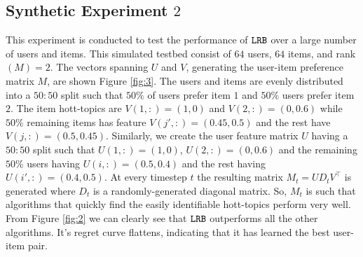 


\subsection{Synthetic Experiment $2$}
This experiment is conducted to test the performance of ${\tt LRB}$ over a large number of users and items. This simulated testbed consist of $64$ users, $64$ items, and rank$(M) = 2$. The vectors spanning $U$ and $V$, generating the user-item preference matrix $M$, are shown Figure \ref{fig:3}. The users and items are evenly distributed into a $50:50$ split such that $50\%$ of users prefer item $1$ and $50\%$ users prefer item $2$. The item hott-topics are $V(1,:) = (1,0)$ and $V(2,:) = (0, 0.6)$ while $50\%$ remaining  items has feature $V(j',:) = (0.45, 0.5)$ and the rest have $V(j,:) = (0.5, 0.45)$. Similarly, we create the user feature matrix $U$ having a $50:50$ split such that $U(1,:) = (1,0)$, $U(2,:) = (0,0.6)$ and the remaining $50\%$ users having $U(i,:) = (0.5,0.4)$ and the rest having $U(i',:) = (0.4,0.5)$. At every timestep $t$ the resulting matrix $M_t =UD_tV^{\intercal}$ is generated where $D_t$ is a randomly-generated diagonal matrix. So, $M_t$ is such that algorithms that quickly find the easily identifiable hott-topics perform very well. From Figure \ref{fig:2} we can clearly see that ${\tt LRB}$ outperforms all the other algorithms. It's  regret curve flattens, indicating that it has learned the best user-item pair. 


